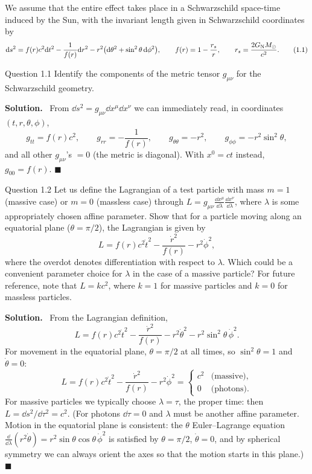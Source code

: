 \documentclass[11pt,a4paper]{article}
\numberwithin{equation}{subsection}
\newenvironment{solution}{\par\noindent\textbf{\textcolor{excol!70!black}{Solution.}}\ }{\hfill$\blacksquare$\par\medskip}
\newcommand{\added}[1]{{\color{teal!60!black}#1}}
\begin{document}
We assume that the entire effect takes place in a Schwarzschild space-time induced by the Sun, with the invariant length given in Schwarzschild coordinates by
\[
  \mathrm{d} s^2=f(r)c^2\mathrm{d} t^2-\frac{1}{f(r)}\mathrm{d} r^2-r^2\big(\mathrm{d}\theta^2+\sin^2\theta\,\mathrm{d}\phi^2\big),\qquad f(r)=1-\frac{r_s}{r},\qquad r_s=\frac{2G_{\mathrm N} M_\odot}{c^2}. \tag{1.1}
\]

\begin{problem}{Question 1.1}
Identify the components of the metric tensor $g_{\mu\nu}$ for the Schwarzschild geometry.
\end{problem}
\begin{solution}
From $\dd s^2=g_{\mu\nu}\dd x^\mu\dd x^\nu$ we can immediately read, in coordinates $(t,r,\theta,\phi)$,
\[
  g_{tt}=f(r)c^2,\qquad g_{rr}=-\frac{1}{f(r)},\qquad g_{\theta\theta}=-r^2,\qquad g_{\phi\phi}=-r^2\sin^2\theta,
\]
and all other $g_{\mu\nu}$'s $=0$ (the metric is diagonal). \added{With $x^0=ct$ instead, $g_{00}=f(r)$.}
\end{solution}

\begin{problem}{Question 1.2}
Let us define the Lagrangian of a test particle with mass $m=1$ (massive case) or $m=0$ (massless case) through $L=g_{\mu\nu}\frac{\dd x^\mu}{\dd\lambda}\frac{\dd x^\nu}{\dd\lambda}$, where $\lambda$ is some appropriately chosen affine parameter. Show that for a particle moving along an equatorial plane ($\theta=\pi/2$), the Lagrangian is given by
\[
  L=f(r)c^2\dot t^2-\frac{\dot r^2}{f(r)}-r^2\dot\phi^2, \tag{1.3}
\]
where the overdot denotes differentiation with respect to $\lambda$. Which could be a convenient parameter choice for $\lambda$ in the case of a massive particle? For future reference, note that $L=kc^2$, where $k=1$ for massive particles and $k=0$ for massless particles.
\end{problem}
\begin{solution}
From the Lagrangian definition,
\[
  L=f(r)c^2\dot t^2-\frac{\dot r^2}{f(r)}-r^2\dot\theta^2-r^2\sin^2\theta\,\dot\phi^2 .
\]
For movement in the equatorial plane, $\theta=\pi/2$ at all times, so $\sin^2\theta=1$ and $\dot\theta=0$:
\[
  L=f(r)c^2\dot t^2-\frac{\dot r^2}{f(r)}-r^2\dot\phi^2=\begin{cases}c^2&\text{(massive)},\\0&\text{(photons)}.\end{cases}
\]
For massive particles we typically choose $\lambda=\tau$, the proper time: then $L=\dd s^2/\dd\tau^2=c^2$. \added{(For photons $\dd\tau=0$ and $\lambda$ must be another affine parameter. Motion in the equatorial plane is consistent: the $\theta$ Euler--Lagrange equation $\frac{\dd}{\dd\lambda}(r^2\dot\theta)=r^2\sin\theta\cos\theta\,\dot\phi^2$ is satisfied by $\theta=\pi/2$, $\dot\theta=0$, and by spherical symmetry we can always orient the axes so that the motion starts in this plane.)}
\end{solution}
\end{document}
